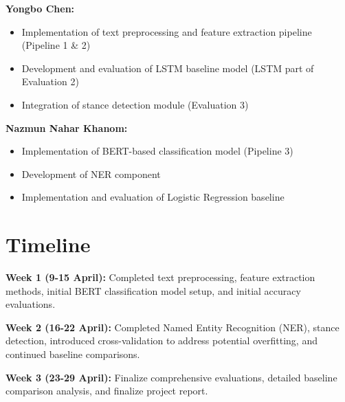 \documentclass[11pt,a4paper]{article}
\begin{document}
\noindent\textbf{Yongbo Chen:}
\begin{itemize}[noitemsep,topsep=0pt]
    \item Implementation of text preprocessing and feature extraction pipeline (Pipeline 1 \& 2)
    \item Development and evaluation of LSTM baseline model (LSTM part of Evaluation 2)
    \item Integration of stance detection module (Evaluation 3)
\end{itemize}

\noindent\textbf{Nazmun Nahar Khanom:}
\begin{itemize}[noitemsep,topsep=0pt]
    \item Implementation of BERT-based classification model (Pipeline 3)
    \item Development of NER component
    \item Implementation and evaluation of Logistic Regression baseline
\end{itemize}

\section{Timeline}

\textbf{Week 1 (9-15 April):} Completed text preprocessing, feature extraction methods, initial BERT classification model setup, and initial accuracy evaluations.

\textbf{Week 2 (16-22 April):} Completed Named Entity Recognition (NER), stance detection, introduced cross-validation to address potential overfitting, and continued baseline comparisons.

\textbf{Week 3 (23-29 April):} Finalize comprehensive evaluations, detailed baseline comparison analysis, and finalize project report.







\end{document}
